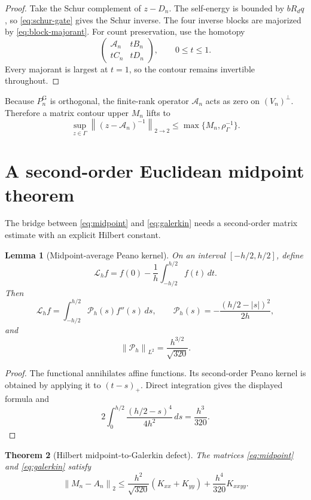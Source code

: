 \documentclass[11pt]{article}
\newtheorem{theorem}{Theorem}[section]
\newtheorem{lemma}[theorem]{Lemma}
\theoremstyle{definition}
\theoremstyle{remark}
\newcommand{\cA}{\mathcal A}
\newcommand{\norm}[1]{\left\lVert #1\right\rVert}
\begin{document}
\begin{proof}
Take the Schur complement of $z-D_n$.  The self-energy is bounded by
$bR_dq$, so \eqref{eq:schur-gate} gives the Schur inverse.  The four inverse
blocks are majorized by \eqref{eq:block-majorant}.  For count preservation,
use the homotopy
\[
 \begin{pmatrix}\cA_n&tB_n\\tC_n&tD_n\end{pmatrix},
 \qquad0\le t\le1.
\]
Every majorant is largest at $t=1$, so the contour remains invertible
throughout.
\end{proof}

Because $P_n^{\mathrm G}$ is orthogonal, the finite-rank operator
$\cA_n$ acts as zero on $(V_n)^\perp$.  Therefore a matrix contour upper
$M_n$ lifts to
\begin{equation}
 \sup_{z\in\Gamma}\norm{(z-\cA_n)^{-1}}_{2\to2}
 \le\max\{M_n,\rho_\Gamma^{-1}\}.
 \label{eq:orthogonal-zero-complement}
\end{equation}

\section{A second-order Euclidean midpoint theorem}
\label{sec:midpoint-theorem}

The bridge between \eqref{eq:midpoint} and \eqref{eq:galerkin} needs a
second-order matrix estimate with an explicit Hilbert constant.

\begin{lemma}[Midpoint-average Peano kernel]
\label{lem:peano}
On an interval $[-h/2,h/2]$, define
\[
 \mathcal L_hf=f(0)-\frac1h\int_{-h/2}^{h/2}f(t)\,dt.
\]
Then
\[
 \mathcal L_hf=\int_{-h/2}^{h/2}\mathscr P_h(s)f''(s)\,ds,
\qquad
 \mathscr P_h(s)
 =-\frac{(h/2-|s|)^2}{2h},
\]
and
\begin{equation}
 \norm{\mathscr P_h}_{L^2}=\frac{h^{3/2}}{\sqrt{320}}.
 \label{eq:peano-norm}
\end{equation}
\end{lemma}

\begin{proof}
The functional annihilates affine functions.  Its second-order Peano kernel
is obtained by applying it to $(t-s)_+$.  Direct integration gives the
displayed formula and
\[
 2\int_0^{h/2}\frac{(h/2-s)^4}{4h^2}\,ds
 =\frac{h^3}{320}.
\]
\end{proof}

\begin{theorem}[Hilbert midpoint-to-Galerkin defect]
\label{thm:midpoint-galerkin}
The matrices \eqref{eq:midpoint} and \eqref{eq:galerkin} satisfy
\begin{equation}
 \norm{M_n-A_n}_2
 \le
 \frac{h^2}{\sqrt{320}}(K_{xx}+K_{yy})
 +\frac{h^4}{320}K_{xxyy}.
 \label{eq:midpoint-galerkin-bound}
\end{equation}
\end{theorem}
\end{document}

